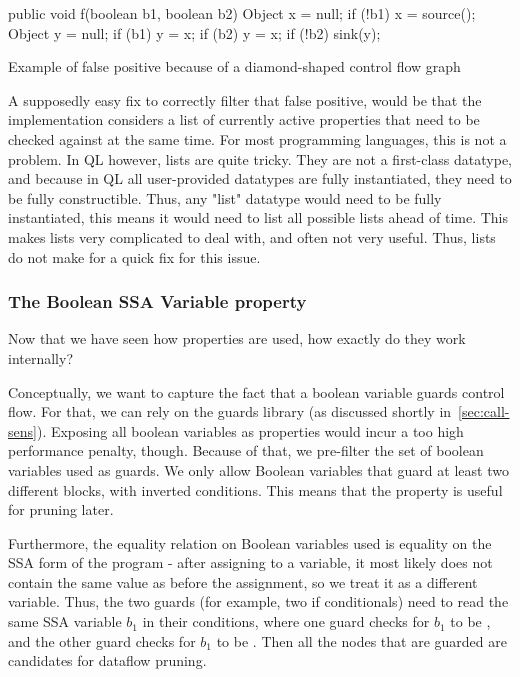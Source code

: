 \begin{listing}
    \begin{javacode}
public void f(boolean b1, boolean b2) {
    Object x = null;
    if (!b1) {
        x = source();
    }
    Object y = null;
    if (b1) {
        y = x;
    }
    if (b2) {
        y = x;
    }
    if (!b2) {
        sink(y);
    }
}
    \end{javacode}
    \caption{Example of false positive because of a diamond-shaped control flow graph}
    \label{lst:ps-diamond}
\end{listing}

A supposedly easy fix to correctly filter that false positive,
would be that the implementation considers a list of currently active
properties that need to be checked against at the same time.
For most programming languages, this is not a problem.
In QL however, lists are quite tricky.
They are not a first-class datatype, and because in QL all user-provided datatypes 
are fully instantiated, they need to be fully constructible.
Thus, any "list" datatype would need to be fully instantiated, this means it would
need to list all possible lists ahead of time.
This makes lists very complicated to deal with, and often not very useful.
Thus, lists do not make for a quick fix for this issue.

\subsubsection*{The Boolean SSA Variable property}
Now that we have seen how properties are used, how exactly do they work internally?

Conceptually, we want to capture the fact that a boolean variable guards 
control flow.
For that, we can rely on the guards library (as discussed shortly in~\autoref{sec:call-sens}).
Exposing all boolean variables as properties would incur a too high performance penalty,
though.
Because of that, we pre-filter the set of boolean variables used as guards.
We only allow Boolean variables that guard at least two different blocks,
with inverted conditions.
This means that the property is useful for pruning later.

Furthermore, the equality relation on Boolean variables used is equality on the 
SSA form of the program - after assigning to a variable, it most likely does not
contain the same value as before the assignment, so we treat it as a different variable.
Thus, the two guards (for example, two if conditionals) need to read the same SSA 
variable $b_1$ in their conditions, where one guard checks for $b_1$ to be ,
and the other guard checks for $b_1$ to be .
Then all the nodes that are guarded are candidates for dataflow pruning.

